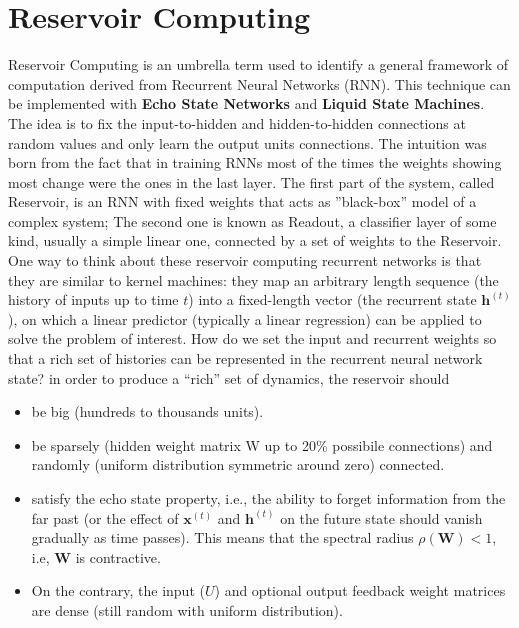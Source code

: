 \section{Reservoir Computing}
Reservoir Computing is an umbrella term used to identify a general framework of computation derived from Recurrent Neural Networks (RNN). This technique can be implemented with \textbf{Echo State Networks} and \textbf{Liquid State Machines}. The idea is to fix the input-to-hidden and hidden-to-hidden connections at random values and only learn the output units connections. The intuition was born from the fact that in training RNNs most of the times the weights showing most change were the ones in the last layer.\newline\newline
The first part of the system, called Reservoir, is an RNN with fixed weights that acts as ”black-box” model of a complex system; The second one is known as Readout, a classifier layer of some kind, usually a simple linear one, connected by a set of weights to the Reservoir.\newline\newline
One way to think about these reservoir computing recurrent networks is that they are similar to kernel machines: they map an arbitrary length sequence (the history of inputs up to time $t$) into a fixed-length vector (the recurrent state $\textbf{h}^{(t)}$), on which a linear predictor (typically a linear regression) can be applied to solve
the problem of interest.\newline\newline
How do we set the input and recurrent weights so that a rich set of histories can be represented in the recurrent neural network state? in order to produce a “rich” set of dynamics, the reservoir should
\begin{itemize}
    \item be big (hundreds to thousands units).
    
    \item be sparsely (hidden weight matrix W up to 20\% possibile connections) and randomly (uniform distribution symmetric around zero) connected.

    \item satisfy the echo state property, i.e., the ability to forget information from the far past (or the effect of $\textbf{x}^{(t)}$ and $\textbf{h}^{(t)}$ on the future state should vanish gradually as time passes). This means that the spectral radius $\rho(\textbf{W}) < 1$, i.e, $\textbf{W}$ is contractive. 

    \item On the contrary, the input ($U$) and optional output feedback weight matrices are dense (still random with uniform distribution).
    
\end{itemize}
